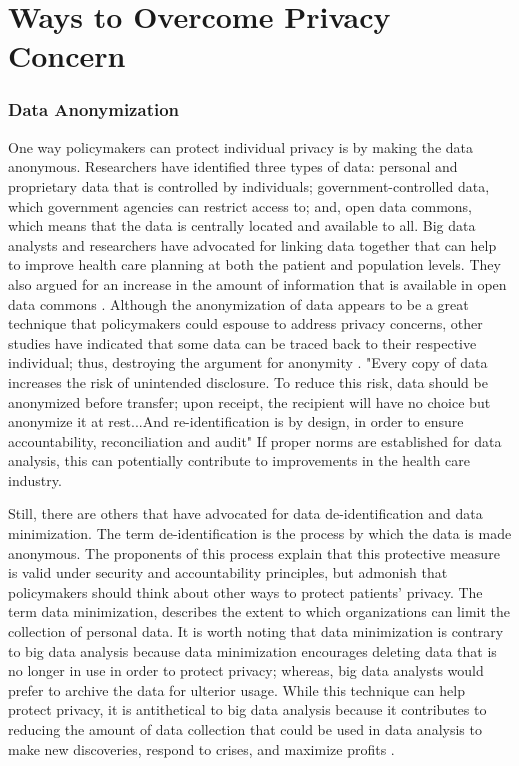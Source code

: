 \documentclass[sigconf]{acmart}
\begin{document}
\section{Ways to Overcome Privacy Concern}
\subsubsection{Data Anonymization}

One way policymakers can protect individual privacy is by making the data anonymous. Researchers have identified three types of data: personal and proprietary data that is controlled by individuals; government-controlled data, which government agencies can restrict access to; and, open data commons, which means that the data is centrally located and available to all. Big data analysts and researchers have advocated for linking data together that can help to improve health care planning at both the patient and population levels. They also argued for an increase in the amount of information that is available in open data commons \cite{roski2014creating}. Although the anonymization of data appears to be a great technique that policymakers could espouse to address privacy concerns, other studies have indicated that some data can be traced back to their respective individual; thus, destroying the argument for anonymity \cite{van2011health}.  "Every copy of data increases the risk of unintended disclosure. To reduce this risk, data should be anonymized before transfer; upon receipt, the recipient will have no choice but anonymize it at rest...And re-identification is by design, in order to ensure accountability, reconciliation and audit" \cite{cavoukian2012privacy} If proper norms are established for data analysis, this can potentially contribute to improvements in the health care industry. 

Still, there are others that have advocated for data de-identification and data minimization. The term de-identification is the process by which the data is made anonymous. The proponents of this process explain that this protective measure is valid under security and accountability principles, but admonish that policymakers should think about other ways to protect patients' privacy. 
The term data minimization, describes the extent to which organizations can limit the collection of personal data. It is worth noting that data minimization is contrary to big data analysis because data minimization encourages deleting data that is no longer in use in order to protect privacy; whereas, big data analysts would prefer to archive the data for ulterior usage. While this technique can help protect privacy, it is antithetical to big data analysis because it contributes to reducing the amount of data collection that could be used in data analysis to make new discoveries, respond to crises, and maximize profits \cite{tene2012big}.
\end{document}
